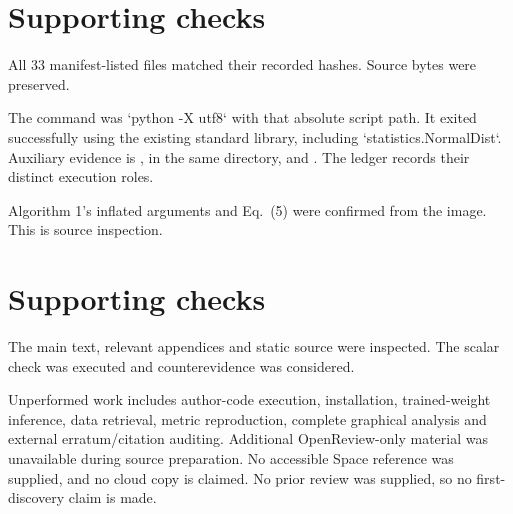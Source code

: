 \documentclass[10pt]{article}
\begin{document}
\section*{Supporting checks}
All 33 manifest-listed files matched their recorded hashes. Source bytes were preserved.\par
The command was `python -X utf8` with that absolute script path. It exited successfully using the existing standard library, including `statistics.NormalDist`. Auxiliary evidence is , in the same directory, and . The ledger records their distinct execution roles.\par
Algorithm 1’s inflated arguments and Eq. (5) were confirmed from the image. This is source inspection.\par
\section*{Supporting checks}
The main text, relevant appendices and static source were inspected. The scalar check was executed and counterevidence was considered.\par
Unperformed work includes author-code execution, installation, trained-weight inference, data retrieval, metric reproduction, complete graphical analysis and external erratum/citation auditing. Additional OpenReview-only material was unavailable during source preparation. No accessible Space reference was supplied, and no cloud copy is claimed. No prior review was supplied, so no first-discovery claim is made.\par
\end{document}

